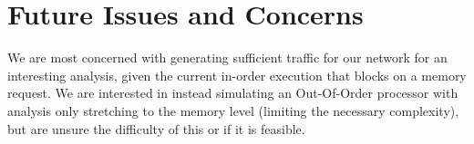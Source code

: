 \documentclass{article}
\begin{document}
\section{Future Issues and Concerns}
We are most concerned with generating sufficient traffic for our network for an interesting analysis, given the current in-order execution that blocks on a memory request. We are interested in instead simulating an Out-Of-Order processor with analysis only stretching to the memory level (limiting the necessary complexity), but are unsure the difficulty of this or if it is feasible. 
\end{document}

